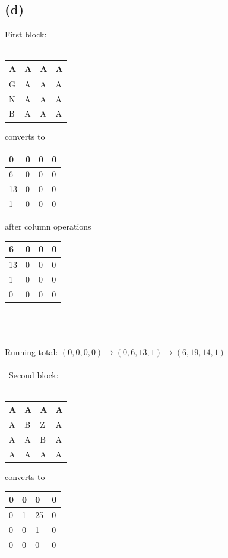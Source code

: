\documentclass[a4paper]{article}
\begin{document}
\subsection*{(d)}
First block:\\\\
\begin{tabular}{|l|l|l|l|}
\hline
A & A & A & A \\ \hline
G & A & A & A \\ \hline
N & A & A & A \\ \hline
B & A & A & A \\ \hline
\end{tabular}
\quad
converts to 
\quad
\begin{tabular}{|l|l|l|l|}
\hline
0 & 0 & 0 & 0 \\ \hline
6 & 0 & 0 &0 \\ \hline
13 & 0 & 0 &0 \\ \hline
1 & 0 & 0 & 0 \\ \hline
\end{tabular}
\quad
after column operations
\quad
\begin{tabular}{|l|l|l|l|}
\hline
6 & 0 & 0 & 0 \\ \hline
13 & 0 & 0 &0 \\ \hline
1 & 0 & 0 &0 \\ \hline
0 & 0 & 0 & 0 \\ \hline
\end{tabular}
\\\\\\Running total: $(0, 0, 0, 0) \rightarrow (0, 6, 13, 1) \rightarrow (6, 19, 14, 1)$\\\\\
Second block:\\\\
\begin{tabular}{|l|l|l|l|}
\hline
A & A & A & A \\ \hline
A & B & Z & A \\ \hline
A & A & B & A \\ \hline
A & A & A & A \\ \hline
\end{tabular}
\quad
converts to 
\quad
\begin{tabular}{|l|l|l|l|}
\hline
0 & 0 & 0 & 0 \\ \hline
0 & 1 & 25 &0 \\ \hline
0 & 0 & 1 &0 \\ \hline
0 & 0 & 0 & 0 \\ \hline
\end{tabular}
\end{document}
